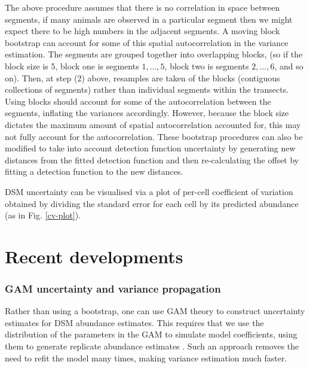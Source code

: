 \documentclass[a4paper,12pt]{article}
\begin{document}
The above procedure assumes that there is no correlation in space between segments, if many animals are observed in a particular segment then we might expect there to be high numbers in the adjacent segments. A moving block bootstrap \citep[MBB;][Section 8.6]{Efron:1993tv} can account for some of this spatial autocorrelation in the variance estimation. The segments are grouped together into overlapping blocks, (so if the block size is 5, block one is segments $1,\ldots,5$, block two is segments $2,\ldots,6$, and so on). Then, at step (2) above, resamples are taken of the blocks (contiguous collections of segments) rather than individual segments within the transects. Using blocks should account for some of the autocorrelation between the segments, inflating the variances accordingly. However, because the block size dictates the maximum amount of spatial autocorrelation accounted for, this may not fully account for the autocorrelation. These bootstrap procedures can also be modified to take into account detection function uncertainty by generating new distances from the fitted detection function and then re-calculating the offset by fitting a detection function to the new distances.
 
DSM uncertainty can be visualised via a plot of per-cell coefficient of variation obtained by dividing the standard error for each cell by its predicted abundance (as in Fig. \ref{cv-plot}). 

\section*{Recent developments}
\label{s:recentadvances}

\subsubsection*{GAM uncertainty and variance propagation}

Rather than using a bootstrap, one can use GAM theory to construct uncertainty estimates for DSM abundance estimates. This requires that we use the distribution of the parameters in the GAM to simulate model coefficients, using them to generate replicate abundance estimates \citep[further information can found in][page 245]{Wood:2006wz}. Such an approach removes the need to refit the model many times, making variance estimation much faster.
 
\end{document}
